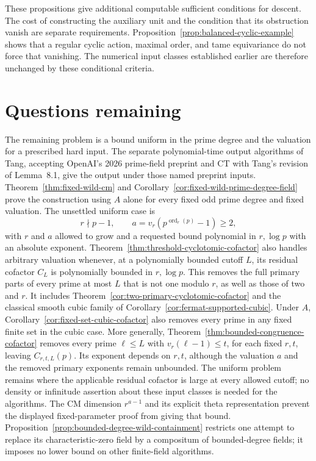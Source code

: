 \documentclass[11pt]{article}
\theoremstyle{definition}
\theoremstyle{remark}
\begin{document}
These propositions give additional computable sufficient conditions
for descent.  The cost of constructing the auxiliary unit and the
condition that its obstruction vanish are separate requirements.
Proposition~\ref{prop:balanced-cyclic-example} shows that a regular
cyclic action, maximal order, and tame equivariance do not force that
vanishing.  The numerical input classes established earlier are
therefore unchanged by these conditional criteria.

\section{Questions remaining}
The remaining problem is a bound uniform in the prime degree and
the valuation for a prescribed hard input. The separate polynomial-time
output algorithms of Tang, accepting OpenAI's 2026 prime-field preprint and \(\mathrm{CT}\)
with Tang's revision of Lemma~8.1, give the output under those
named preprint inputs.
Theorem~\ref{thm:fixed-wild-cm} and
Corollary~\ref{cor:fixed-wild-prime-degree-field} prove the
construction using \(A\) alone for every fixed odd prime degree
and fixed valuation. The unsettled uniform case is
\[
 r\nmid p-1,\qquad a=v_r(p^{\operatorname{ord}_r(p)}-1)\ge2,
\]
with \(r\) and \(a\) allowed to grow and a requested bound
polynomial in \(r,\log p\) with an absolute exponent.
Theorem~\ref{thm:threshold-cyclotomic-cofactor} also handles arbitrary
valuation whenever, at a polynomially bounded cutoff \(L\), its
residual cofactor \(C_L\) is polynomially bounded in \(r,\log p\).
This removes the full primary parts of every prime at most \(L\)
that is not one modulo \(r\), as well as those of two and \(r\).
It includes Theorem~\ref{cor:two-primary-cyclotomic-cofactor}
and the classical smooth cubic family of
Corollary~\ref{cor:fermat-supported-cubic}.
Under \(A\), Corollary~\ref{cor:fixed-set-cubic-cofactor} also
removes every prime in any fixed finite set in the cubic case.
More generally, Theorem~\ref{thm:bounded-congruence-cofactor} removes
every prime \(\ell\le L\) with \(v_r(\ell-1)\le t\), for each
fixed \(r,t\), leaving \(C_{r,t,L}(p)\). Its exponent depends on
\(r,t\), although the valuation \(a\) and the removed primary
exponents remain unbounded.
The uniform problem remains where the applicable residual cofactor is
large at every allowed cutoff; no density or infinitude assertion
about these input classes is needed for the algorithms.
The CM dimension \(r^{a-1}\) and its explicit theta representation
prevent the displayed fixed-parameter proof from giving that bound.
Proposition~\ref{prop:bounded-degree-wild-containment} restricts
one attempt to replace its characteristic-zero field by a compositum
of bounded-degree fields; it imposes no lower bound on other
finite-field algorithms.
\end{document}
